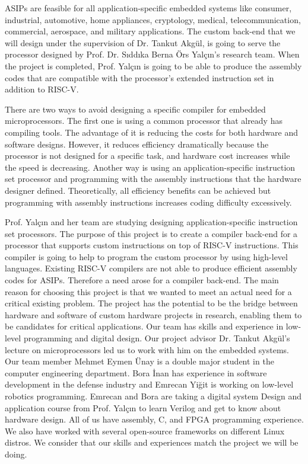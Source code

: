 ASIPs are feasible for all application-specific embedded systems like consumer, industrial, automotive, home appliances, cryptology, medical, telecommunication, commercial, aerospace, and military applications. The custom back-end that we will design under the supervision of Dr. Tankut Akgül, is going to serve the processor designed by Prof. Dr. Sıddıka Berna Örs Yalçın’s research team. When the project is completed, Prof. Yalçın is going to be able to produce the assembly codes that are compatible with the processor’s extended instruction set in addition to RISC-V.

There are two ways to avoid designing a specific compiler for embedded microprocessors. The first one is using a common processor that already has compiling tools. The advantage of it is reducing the costs for both hardware and software designs. However, it reduces efficiency dramatically because the processor is not designed for a specific task, and hardware cost increases while the speed is decreasing. Another way is using an application-specific instruction set processor and programming with the assembly instructions that the hardware designer defined. Theoretically, all efficiency benefits can be achieved but programming with assembly instructions increases coding difficulty excessively.

Prof. Yalçın and her team are studying designing application-specific instruction set processors. The purpose of this project is to create a compiler back-end for a processor that supports custom instructions on top of RISC-V instructions. This compiler is going to help to program the custom processor by using high-level languages. Existing RISC-V compilers are not able to produce efficient assembly codes for ASIPs. Therefore a need arose for a compiler back-end.
The main reason for choosing this project is that we wanted to meet an actual need for a critical existing problem. The project has the potential to be the bridge between hardware and software of custom hardware projects in research, enabling them to be candidates for critical applications. Our team has skills and experience in low-level programming and digital design. Our project advisor Dr. Tankut Akgül’s lecture on microprocessors led us to work with him on the embedded systems. Our team member Mehmet Eymen Ünay is a double major student in the computer engineering department. Bora İnan has experience in software development in the defense industry and Emrecan Yiğit is working on low-level robotics programming. Emrecan and Bora are taking a digital system Design and application course from Prof. Yalçın to learn Verilog and get to know about hardware design. All of us have assembly, C, and FPGA programming experience. We also have worked with several open-source frameworks on different Linux distros. We consider that our skills and experiences match the project we will be doing.

